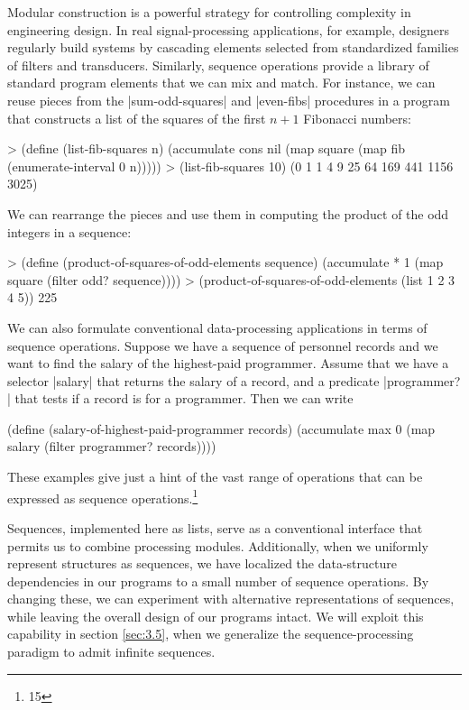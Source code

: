 Modular construction is a powerful strategy for
controlling complexity in engineering design.  In real
signal-processing applications, for example, designers regularly build
systems by cascading elements selected from standardized families of
filters and transducers.  Similarly, sequence operations provide a
library of standard program elements that we can mix and match.  For
instance, we can reuse pieces from the \scheme|sum-odd-squares| and \scheme|even-fibs| procedures in a program that constructs a list of the
squares of the first $n+1$ Fibonacci numbers:

\begin{schemedisplay}
> (define (list-fib-squares n)
    (accumulate cons
                nil
                (map square
                     (map fib
                          (enumerate-interval 0 n)))))
> (list-fib-squares 10)
(0 1 1 4 9 25 64 169 441 1156 3025)
\end{schemedisplay}

We can rearrange the pieces and use them in computing the product of
the odd integers in a sequence:
\begin{schemedisplay}
> (define (product-of-squares-of-odd-elements sequence)
    (accumulate *
                1
                (map square
                     (filter odd? sequence))))
> (product-of-squares-of-odd-elements (list 1 2 3 4 5))
225
\end{schemedisplay}

We can also formulate conventional data-processing applications in
terms of sequence operations.  Suppose we have a sequence of personnel
records and we want to find the salary of the highest-paid programmer.
Assume that we have a selector \scheme|salary| that returns the salary of
a record, and a predicate \scheme|programmer?| that tests if a record is
for a programmer.  Then we can write
\begin{schemedisplay}
(define (salary-of-highest-paid-programmer records)
  (accumulate max
              0
              (map salary
                   (filter programmer? records))))
\end{schemedisplay}
These examples give just a hint of the vast range of operations that
can be expressed as sequence operations.\footnote{15}

Sequences, implemented here as lists, serve as a conventional
interface that permits us to combine processing modules.
Additionally, when we uniformly represent structures as sequences, we
have localized the data-structure dependencies in our programs to a
small number of sequence operations.  By changing these, we can
experiment with alternative representations of sequences, while
leaving the overall design of our programs intact.  We will exploit
this capability in section \ref{sec:3.5}, when we generalize the
sequence-processing paradigm to admit infinite sequences.

